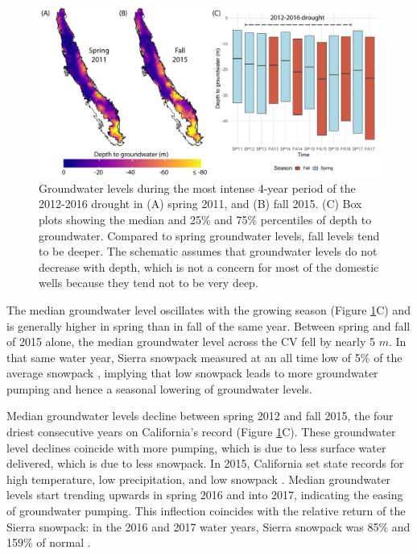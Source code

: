 \begin{figure}[ht]%
	\includegraphics[width=\textwidth]{ch2_appendix_figs/erl_sp_fa_gwl.pdf}
	\caption{Groundwater levels during the most intense 4-year period of the 2012-2016 drought in (A) spring 2011, and (B) fall 2015. (C) Box plots showing the median and 25\% and 75\% percentiles of depth to groundwater. Compared to spring groundwater levels, fall levels tend to be deeper. The schematic assumes that groundwater levels do not decrease with depth, which is not a concern for most of the domestic wells because they tend not to be very deep.}
	\label{fig:sp_fall_gwl_2}
\end{figure}

The median groundwater level oscillates with the growing season (Figure \ref{fig:sp_fall_gwl_2}C) and is generally higher in spring than in fall of the same year. Between spring and fall of 2015 alone, the median groundwater level across the CV fell by nearly 5 $m$. In that same water year, Sierra snowpack measured at an all time low of 5\% of the average snowpack \cite{cadwr2017}, implying that low snowpack leads to more groundwater pumping and hence a seasonal lowering of groundwater levels. 

Median groundwater levels decline between spring 2012 and fall 2015, the four driest consecutive years on California's record (Figure \ref{fig:sp_fall_gwl_2}C). These groundwater level declines coincide with more pumping, which is due to less surface water delivered, which is due to less snowpack. In 2015, California set state records for high temperature, low precipitation, and low snowpack \cite{cadwr2017}. Median groundwater levels start trending upwards in spring 2016 and into 2017, indicating the easing of groundwater pumping. This inflection coincides with the relative return of the Sierra snowpack: in the 2016 and 2017 water years, Sierra snowpack was 85\% and 159\% of normal \cite{cadwr2016, cadwr2017}.  

